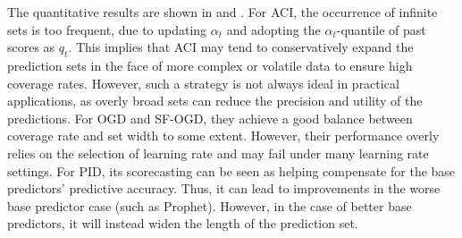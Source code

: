 The quantitative results are shown in  and . For ACI, the occurrence of infinite sets is too frequent, due to updating $\alpha_t$ and adopting the $\alpha_t$-quantile of past scores as $q_t$. This implies that ACI may tend to conservatively expand the prediction sets in the face of more complex or volatile data to ensure high coverage rates. However, such a strategy is not always ideal in practical applications, as overly broad sets can reduce the precision and utility of the predictions. For OGD and SF-OGD, they achieve a good balance between coverage rate and set width to some extent. However, their performance overly relies on the selection of learning rate and may fail under many learning rate settings. For PID, its scorecasting can be seen as helping compensate for the base predictors' predictive accuracy. Thus, it can lead to improvements in the worse base predictor case (such as Prophet). However, in the case of better base predictors, it will instead widen the length of the prediction set. 

